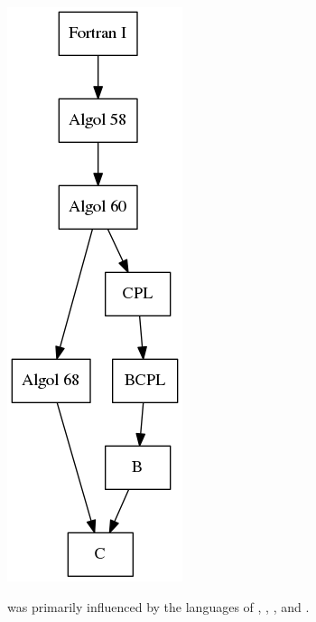 \documentclass[../languages.tex]{subfiles}
\begin{document}
\begin{Figure}
  \centering
  \includegraphics[height=0.5\textheight]{c}
\end{Figure}

 was primarily influenced by the languages of ,
, , and .

\newpage
\end{document}
